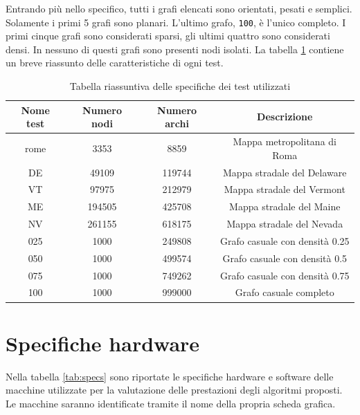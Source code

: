 \documentclass[12pt,a4paper,oneside]{book}
\begin{document}
	Entrando più nello specifico, tutti i grafi elencati sono orientati, pesati e semplici. Solamente i primi 5 grafi sono planari. L'ultimo grafo, \texttt{100}, è l'unico completo. I primi cinque grafi sono considerati sparsi, gli ultimi quattro sono considerati densi. In nessuno di questi grafi sono presenti nodi isolati. La tabella \ref{tab:riassunto_test} contiene un breve riassunto delle caratteristiche di ogni test.
	\begin{table}[!ht]
		\centering
		\begin{tabular}{|c|c|c|c|}
			\hline
			\textbf{Nome test} & \textbf{Numero nodi} & \textbf{Numero archi} & \textbf{Descrizione} \\ \hline
			rome & 3353 & 8859 & Mappa metropolitana di Roma \\ \hline
			DE & 49109 & 119744 & Mappa stradale del Delaware \\ \hline
			VT & 97975 & 212979 & Mappa stradale del Vermont \\ \hline
			ME & 194505 & 425708 & Mappa stradale del Maine \\ \hline
			NV & 261155 & 618175 & Mappa stradale del Nevada \\ \hline
			025 & 1000 & 249808 & Grafo casuale con densità 0.25 \\ \hline
			050 & 1000 & 499574 & Grafo casuale con densità 0.5 \\ \hline
			075 & 1000 & 749262 & Grafo casuale con densità 0.75 \\ \hline
			100 & 1000 & 999000 & Grafo casuale completo \\ \hline
		\end{tabular}
		\caption{Tabella riassuntiva delle specifiche dei test utilizzati}
		\label{tab:riassunto_test}
	\end{table}
	
	\section{Specifiche hardware}
	Nella tabella \ref{tab:specs} sono riportate le specifiche hardware e software delle macchine utilizzate per la valutazione delle prestazioni degli algoritmi proposti. Le macchine saranno identificate tramite il nome della propria scheda grafica.
	
\end{document}
